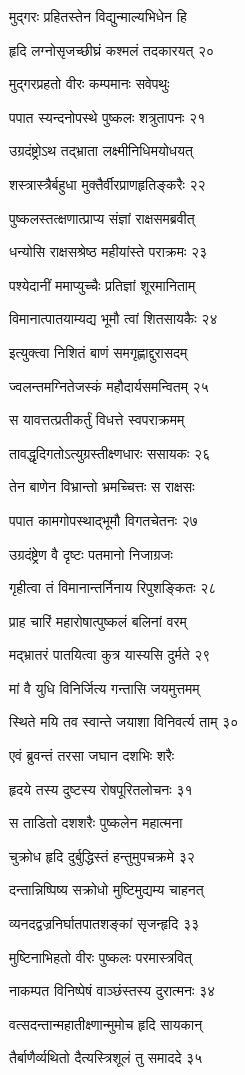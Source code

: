 मुद्गरः प्रहितस्तेन विद्युन्माल्यभिधेन हि

हृदि लग्नोसृजच्छीघ्रं कश्मलं तदकारयत् २०

मुद्गरप्रहतो वीरः कम्पमानः सवेपथुः

पपात स्यन्दनोपस्थे पुष्कलः शत्रुतापनः २१

उग्रदंष्ट्रोऽथ तद्भ्राता लक्ष्मीनिधिमयोधयत्

शस्त्रास्त्रैर्बहुधा मुक्तैर्वीरप्राणहृतिङ्करैः २२

पुष्कलस्तत्क्षणात्प्राप्य संज्ञां राक्षसमब्रवीत्

धन्योसि राक्षसश्रेष्ठ महीयांस्ते पराक्रमः २३

पश्येदानीं ममाप्युच्चैः प्रतिज्ञां शूरमानिताम्

विमानात्पातयाम्यद्य भूमौ त्वां शितसायकैः २४

इत्युक्त्वा निशितं बाणं समगृह्णाद्दुरासदम्

ज्वलन्तमग्नितेजस्कं महौदार्यसमन्वितम् २५

स यावत्तत्प्रतीकर्तुं विधत्ते स्वपराक्रमम्

तावद्धृदिगतोऽत्युग्रस्तीक्ष्णधारः ससायकः २६

तेन बाणेन विभ्रान्तो भ्रमच्चित्तः स राक्षसः

पपात कामगोपस्थाद्भूमौ विगतचेतनः २७

उग्रदंष्ट्रेण वै दृष्टः पतमानो निजाग्रजः

गृहीत्वा तं विमानान्तर्निनाय रिपुशङ्कितः २८

प्राह चारिं महारोषात्पुष्कलं बलिनां वरम्

मद्भ्रातरं पातयित्वा कुत्र यास्यसि दुर्मते २९

मां वै युधि विनिर्जित्य गन्तासि जयमुत्तमम्

स्थिते मयि तव स्वान्ते जयाशा विनिवर्त्य ताम् ३०

एवं ब्रुवन्तं तरसा जघान दशभिः शरैः

हृदये तस्य दुष्टस्य रोषपूरितलोचनः ३१

स ताडितो दशशरैः पुष्कलेन महात्मना

चुक्रोध हृदि दुर्बुद्धिस्तं हन्तुमुपचक्रमे ३२

दन्तान्निष्पिष्य सक्रोधो मुष्टिमुद्यम्य चाहनत्

व्यनदद्वज्रनिर्घातपातशङ्कां सृजन्हृदि ३३

मुष्टिनाभिहतो वीरः पुष्कलः परमास्त्रवित्

नाकम्पत विनिष्पेषं वाञ्छंस्तस्य दुरात्मनः ३४

वत्सदन्तान्महातीक्ष्णान्मुमोच हृदि सायकान्

तैर्बाणैर्व्यथितो दैत्यस्त्रिशूलं तु समाददे ३५

